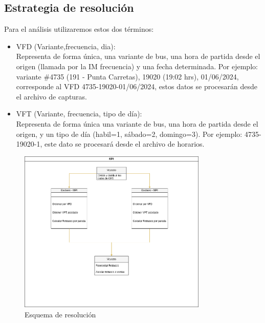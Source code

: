 \documentclass[journal]{IEEEtran}
\begin{document}
\subsection{Estrategia de resolución}
Para el análisis utilizaremos estos dos términos: 

\begin{itemize}
  \item VFD (Variante,frecuencia,  dia): \\Representa de forma única, una variante de bus, una hora de partida desde el origen (llamada por la IM frecuencia) y una fecha determinada. Por ejemplo: variante \#4735 (191 - Punta Carretas), 19020 (19:02 hrs), 01/06/2024, corresponde al VFD 4735-19020-01/06/2024, estos datos se procesarán desde el archivo de capturas.
  \item VFT (Variante, frecuencia, tipo de día): \\Representa de forma única una variante de bus, una hora de partida desde el origen, y un tipo de día (habil=1, sábado=2, domingo=3). Por ejemplo: 4735-19020-1, este dato se procesará desde el archivo de horarios.
\end{itemize}

\begin{figure}
  \centering
  \includegraphics[width=9cm]{diagrama}
  \caption{Esquema de resolución}
\end{figure}
\end{document}

